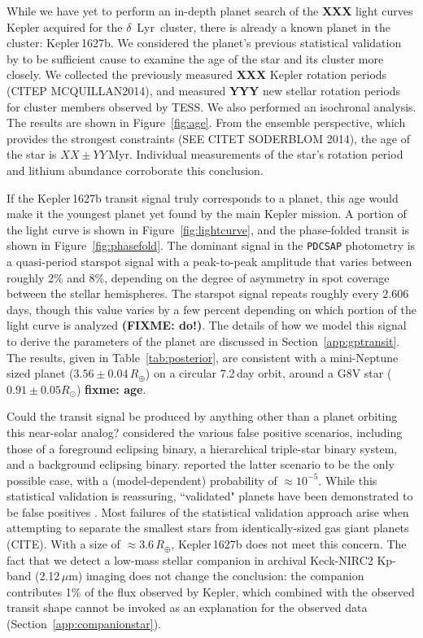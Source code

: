 \documentclass[12pt,modern,tighten]{aastex63}
\newcommand{\cn}{$\delta$~Lyr\ cluster} %
\begin{document}
While we have yet to perform an in-depth planet search of the {\bf
XXX} light curves Kepler acquired for the \cn, there is already a
known planet in the cluster: Kepler\,1627b.  We considered the
planet's previous statistical validation by \citet{morton_false_2016}
to be sufficient cause to examine the age of the star and its cluster more closely.
We collected the previously measured {\bf XXX} Kepler
rotation periods (CITEP MCQUILLAN2014), and measured {\bf YYY} new stellar
rotation periods for cluster members observed by TESS.
We also performed an isochronal analysis.
The results are shown in Figure~\ref{fig:age}.
From the ensemble perspective, which provides the strongest
constraints (SEE CITET SODERBLOM 2014),
the age of the star is $XX \pm YY$\,Myr.
Individual measurements of the star's rotation period and lithium
abundance corroborate this conclusion.

If the Kepler\,1627b transit signal truly corresponds to a planet,
this age would make it the youngest planet yet found by the main
Kepler mission.  A portion of the light curve is shown in
Figure~\ref{fig:lightcurve}, and the phase-folded transit is shown in
Figure~\ref{fig:phasefold}.  The dominant signal in the
\texttt{PDCSAP} photometry is a quasi-period starspot signal with a
peak-to-peak amplitude that varies between roughly 2\% and 8\%,
depending on the degree of asymmetry in spot coverage between the
stellar hemispheres.  The starspot signal repeats roughly every
2.606\,days, though this value varies by a few percent depending on
which portion of the light curve is analyzed {\bf (FIXME: do!)}.  The
details of how we model this signal to derive the parameters of the
planet are discussed in Section~\ref{app:gptransit}.  The results,
given in Table~\ref{tab:posterior}, are consistent with a mini-Neptune
sized planet ($3.56\pm 0.04\,R_\oplus$) on a circular 7.2\,day orbit,
around a G8V star ($0.91 \pm 0.05 R_\odot$) {\bf fixme: age}. 

Could the transit signal be produced by anything other than a planet
orbiting this near-solar analog?  \citet{morton_false_2016} considered
the various false positive scenarios, including those of a foreground
eclipsing binary, a hierarchical triple-star binary system, and a
background eclipsing binary.  \citet{morton_false_2016} reported the
latter scenario to be the only possible case, with a (model-dependent)
probability of $\approx10^{-5}$.  While this statistical validation is
reassuring, ``validated" planets have been demonstrated to be false
positives \citep{shporer_three_2017}.  Most failures of the
statistical validation approach arise when attempting to separate the
smallest stars from identically-sized gas giant planets (CITE).  With a size
of $\approx 3.6\,R_\oplus$, Kepler\,1627b does not meet this
concern.  The fact that we detect a low-mass stellar companion in
archival Keck-NIRC2 Kp-band (2.12\,$\mu $m) imaging does not change
the conclusion: the companion contributes 1\% of the flux
observed by Kepler, which combined with the observed transit shape
cannot be invoked as an explanation for the observed data
(Section~\ref{app:companionstar}).
\end{document}
